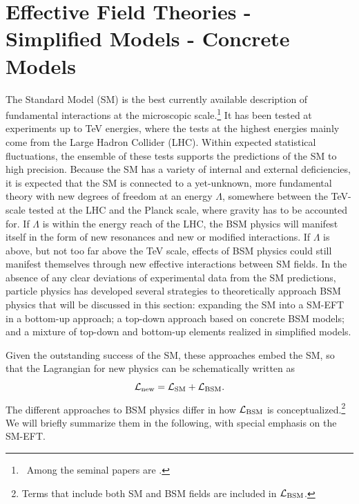 \section{Effective Field Theories - Simplified Models - Concrete Models}
\label{sec:eftintro}

The Standard Model (SM) is the best currently available description of
fundamental interactions at the microscopic scale.\footnote{~Among the seminal papers are \citep{Weinberg:1967tq,Glashow:1961tr,Salammodel,Fritzsch:1973pi, Higgs:1964ia,Higgs:1964pj,Englert:1964et,Guralnik:1964eu, 'tHooft:1972fi}.}
It has been tested at experiments up to TeV energies, where the tests at the highest energies mainly come from the Large Hadron Collider (LHC). 
Within expected statistical fluctuations, the ensemble of these tests
supports the predictions of the SM to high precision.
Because the SM has a variety of internal and external deficiencies, it is expected that the SM is connected to a yet-unknown, more fundamental theory with new degrees of freedom at an energy $\Lambda$, somewhere between the TeV-scale tested at the LHC and the Planck scale, where gravity has to be accounted for. 
If $\Lambda$ is within the energy reach of the LHC, the BSM physics
will manifest itself in the form of new resonances and new or modified
interactions. If $\Lambda$ is above, but not too far above the TeV
scale, effects of BSM physics could still manifest themselves through
new effective interactions between SM fields. In the absence of any
clear deviations of experimental data from the SM predictions,
particle physics has developed several strategies to theoretically
approach BSM physics that will be discussed in this section:
expanding the SM into a SM-EFT in a bottom-up approach; a top-down
approach based on concrete BSM models; and a mixture of top-down and
bottom-up elements realized in simplified models.

Given the outstanding success of the SM, these approaches embed the SM, so that the Lagrangian 
for new physics can be schematically written as 
\begin{equation}
{\cal L}_{\rm new} = {\cal L}_{\rm SM} + {\cal L}_{\rm BSM}.
\label{eq:BSM}
\end{equation}
The different approaches to BSM physics differ in how ${\cal L}_{\rm BSM}$ is 
conceptualized.\footnote{Terms that include both SM and BSM fields are included in ${\cal L}_{\rm BSM}$.}
We will briefly summarize them in the following, with special emphasis on the SM-EFT.  


